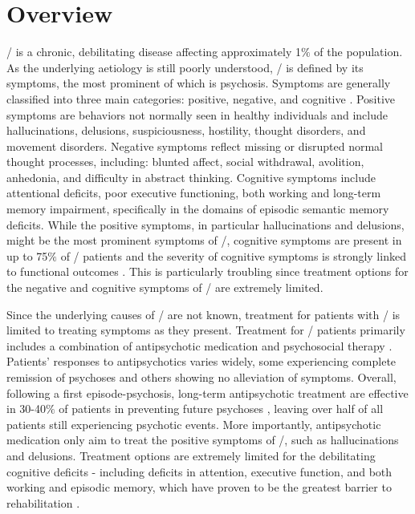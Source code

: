 
\section{Overview}
\Scz/ is a chronic, debilitating disease affecting approximately 1$\%$ of the population\citep{NIMHb}.
As the underlying aetiology is still poorly understood, \scz/ is defined by its symptoms, the most prominent of which is psychosis.
Symptoms are generally classified into three main categories: positive, negative, and cognitive \citep{Kay1982, NIMHa}.
Positive symptoms are behaviors not normally seen in healthy individuals and include hallucinations, delusions, suspiciousness, hostility, thought disorders, and movement disorders.
Negative symptoms reflect missing or disrupted normal thought processes, including: blunted affect, social withdrawal, avolition, anhedonia, and difficulty in abstract thinking.
Cognitive symptoms include attentional deficits, poor executive functioning, both working and long-term memory impairment, specifically in the domains of episodic semantic memory deficits.
While the positive symptoms, in particular hallucinations and delusions, might be the most prominent symptoms of \scz/, cognitive symptoms are present in up to 75$\%$ of \scz/ patients and the severity of cognitive symptoms is strongly linked to functional outcomes \citep{O'Carroll2000, Green1996, Keefe2007}.
This is particularly troubling since treatment options for the negative and cognitive symptoms of \scz/ are extremely limited.

Since the underlying causes of \scz/ are not known, treatment for patients with \scz/ is limited to treating symptoms as they present.
Treatment for \scz/ patients primarily includes a combination of antipsychotic medication and psychosocial therapy \citep{NIMHa}.
Patients’ responses to antipsychotics varies widely, some experiencing complete remission of psychoses and others showing no alleviation of symptoms.
Overall, following a first episode-psychosis, long-term antipsychotic treatment are effective in 30-40$\%$ of patients in preventing future psychoses \citep{Boyer2007, Insel2010}, leaving over half of all patients still experiencing psychotic events.
More importantly, antipsychotic medication only aim to treat the positive symptoms of \scz/, such as hallucinations and delusions.
Treatment options are extremely limited for the debilitating cognitive deficits - including deficits in attention, executive function, and both working and episodic memory, which have proven to be the greatest barrier to rehabilitation \citep{Lieberman2005, Harrison2001, O'Carroll2000, Hyman2003}.

